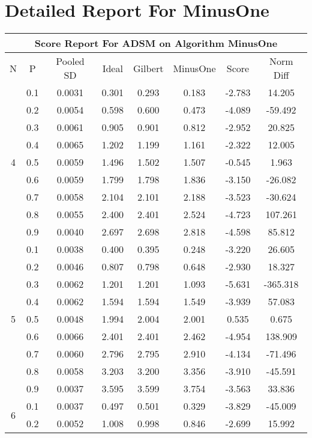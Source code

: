 \documentclass[11pt,a4paper]{report}
\begin{document}
\chapter{Detailed Report For MinusOne}
\begin{longtable}{ | c | c || c | c | c | c | c | c | }
\hline
\multicolumn{8}{|c|}{ Score Report For ADSM on Algorithm MinusOne} \\
\hline
N & P & Pooled SD &  Ideal &  Gilbert & MinusOne  & Score & Norm Diff \\
 \hline
 \hline
 \endhead
\multirow{9}{*}{4} & 0.1 & 0.0031 & 0.301 & 0.293 & 0.183 & -2.783 & 14.205 \\
 & 0.2 & 0.0054 & 0.598 & 0.600 & 0.473 & -4.089 & -59.492 \\
 & 0.3 & 0.0061 & 0.905 & 0.901 & 0.812 & -2.952 & 20.825 \\
 & 0.4 & 0.0065 & 1.202 & 1.199 & 1.161 & -2.322 & 12.005 \\
 & 0.5 & 0.0059 & 1.496 & 1.502 & 1.507 & -0.545 & 1.963 \\
 & 0.6 & 0.0059 & 1.799 & 1.798 & 1.836 & -3.150 & -26.082 \\
 & 0.7 & 0.0058 & 2.104 & 2.101 & 2.188 & -3.523 & -30.624 \\
 & 0.8 & 0.0055 & 2.400 & 2.401 & 2.524 & -4.723 & 107.261 \\
 & 0.9 & 0.0040 & 2.697 & 2.698 & 2.818 & -4.598 & 85.812 \\
 \hline
\multirow{9}{*}{5} & 0.1 & 0.0038 & 0.400 & 0.395 & 0.248 & -3.220 & 26.605 \\
 & 0.2 & 0.0046 & 0.807 & 0.798 & 0.648 & -2.930 & 18.327 \\
 & 0.3 & 0.0062 & 1.201 & 1.201 & 1.093 & -5.631 & -365.318 \\
 & 0.4 & 0.0062 & 1.594 & 1.594 & 1.549 & -3.939 & 57.083 \\
 & 0.5 & 0.0048 & 1.994 & 2.004 & 2.001 & 0.535 & 0.675 \\
 & 0.6 & 0.0066 & 2.401 & 2.401 & 2.462 & -4.954 & 138.909 \\
 & 0.7 & 0.0060 & 2.796 & 2.795 & 2.910 & -4.134 & -71.496 \\
 & 0.8 & 0.0058 & 3.203 & 3.200 & 3.356 & -3.910 & -45.591 \\
 & 0.9 & 0.0037 & 3.595 & 3.599 & 3.754 & -3.563 & 33.836 \\
 \hline
\multirow{9}{*}{6} & 0.1 & 0.0037 & 0.497 & 0.501 & 0.329 & -3.829 & -45.009 \\
 & 0.2 & 0.0052 & 1.008 & 0.998 & 0.846 & -2.699 & 15.992 \\

\end{longtable}
\end{document}
